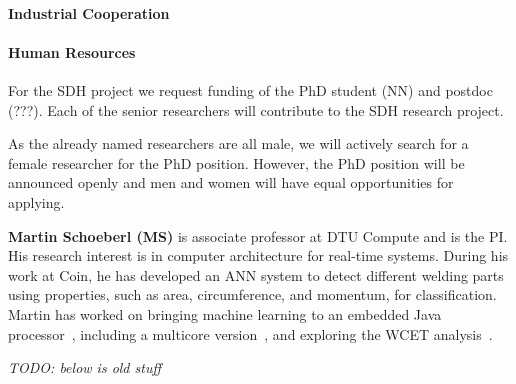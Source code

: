 \documentclass[fleqn,12pt]{article}
\newcommand{\todo}[1]{{\it TODO: #1}}
\begin{document}
\paragraph*{Industrial Cooperation}



\paragraph*{Human Resources}

For the SDH project we
request funding of the PhD student (NN) and postdoc (???).
Each of the senior researchers will contribute to the SDH research project.


As the already named researchers are all male, we will actively search
for a female researcher for the PhD position.
However, the PhD position will be announced openly and men and women
will have equal opportunities for applying.


  {\bf Martin Schoeberl (MS)} is associate professor at DTU Compute and is the PI.
   His research interest is in computer architecture for real-time systems. During his work at Coin,
   he has developed an ANN system to detect different welding parts using
   properties, such as area, circumference, and momentum, for classification.
   Martin has worked on bringing machine learning to an embedded Java processor~\cite{pedersen:2006-64}, including a multicore
   version~\cite{jop:cmpsvn}, and exploring the WCET analysis~\cite{jop:wcet:spe}.
   
\todo{below is old stuff}
%
\end{document}
